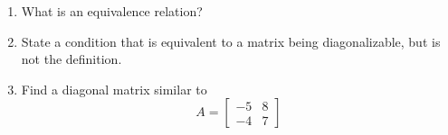 \begin{enumerate}
%
\item What is an equivalence relation?
%
\item State a condition that is equivalent to a matrix being diagonalizable, but is not the definition.
%
\item Find a diagonal matrix similar to 
%
\begin{equation*}
A=\begin{bmatrix}
-5 & 8\\-4 & 7
\end{bmatrix}
\end{equation*}
%
\end{enumerate}